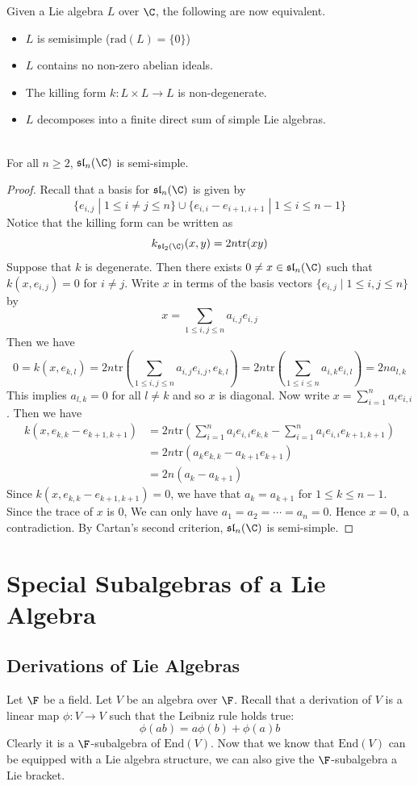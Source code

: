 \documentclass[a4paper]{article}
\begin{document}
Given a Lie algebra $L$ over $\C$, the following are now equivalent. 
\begin{itemize}
\item $L$ is semisimple ($\text{rad}(L)=\{0\}$)
\item $L$ contains no non-zero abelian ideals. 
\item The killing form $k:L\times L\to L$ is non-degenerate. 
\item $L$ decomposes into a finite direct sum of simple Lie algebras. 
\end{itemize}

\begin{eg}{}{} \\For all $n\geq 2$, $\mathfrak{sl}_n(\C)$ is semi-simple. 
\begin{proof}
Recall that a basis for $\mathfrak{sl}_n(\C)$ is given by $$\{e_{i,j}\;|\;1\leq i\neq j\leq n\}\cup\{e_{i,i}-e_{i+1,i+1}\;|\;1\leq i\leq n-1\}$$ Notice that the killing form can be written as $$k_{\mathfrak{sl}_2(\C)}(x,y)=2n\text{tr}(xy)$$ Suppose that $k$ is degenerate. Then there exists $0\neq x\in\mathfrak{sl}_n(\C)$ such that $k(x,e_{i,j})=0$ for $i\neq j$. Write $x$ in terms of the basis vectors $\{e_{i,j}\;|\;1\leq i,j\leq n\}$ by $$x=\sum_{1\leq i,j\leq n}a_{i,j}e_{i,j}$$ Then we have $$0=k(x,e_{k,l})=2n\text{tr}\left(\sum_{1\leq i,j\leq n}a_{i,j}e_{i,j},e_{k,l}\right)=2n\text{tr}\left(\sum_{1\leq i\leq n}a_{i,k}e_{i,l}\right)=2na_{l,k}$$ This implies $a_{l,k}=0$ for all $l\neq k$ and so $x$ is diagonal. Now write $x=\sum_{i=1}^na_ie_{i,i}$. Then we have 
\begin{align*}
k(x,e_{k,k}-e_{k+1,k+1})&=2n\text{tr}\left(\sum_{i=1}^na_ie_{i,i}e_{k,k}-\sum_{i=1}^na_ie_{i,i}e_{k+1,k+1}\right)\\
&=2n\text{tr}(a_ke_{k,k}-a_{k+1}e_{k+1})\\
&=2n(a_k-a_{k+1})
\end{align*}
Since $k(x,e_{k,k}-e_{k+1,k+1})=0$, we have that $a_k=a_{k+1}$ for $1\leq k\leq n-1$. Since the trace of $x$ is $0$, We can only have $a_1=a_2=\cdots=a_n=0$. Hence $x=0$, a contradiction. By Cartan's second criterion, $\mathfrak{sl}_n(\C)$ is semi-simple. 
\end{proof}
\end{eg}

\pagebreak
\section{Special Subalgebras of a Lie Algebra}
\subsection{Derivations of Lie Algebras}
 Let $\F$ be a field. Let $V$ be an algebra over $\F$. Recall that a derivation of $V$ is a linear map $\phi:V\to V$ such that the Leibniz rule holds true: $$\phi(ab)=a\phi(b)+\phi(a)b$$ Clearly it is a $\F$-subalgebra of $\text{End}(V)$. Now that we know that $\text{End}(V)$ can be equipped with a Lie algebra structure, we can also give the $\F$-subalgebra a Lie bracket. 
\end{document}
